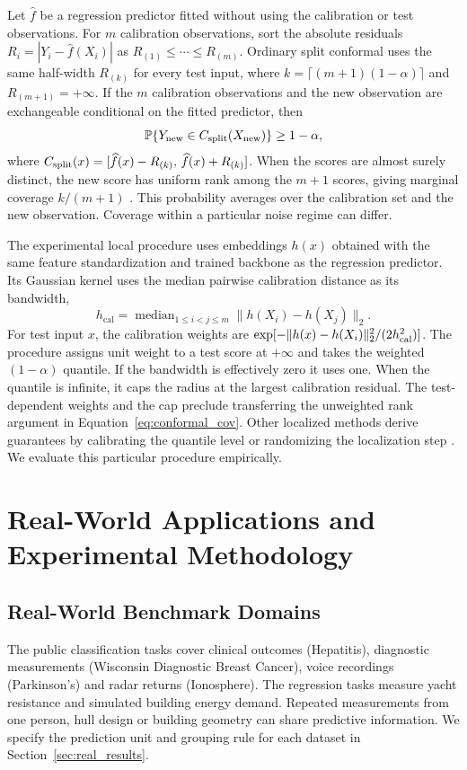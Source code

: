 \documentclass[journal]{IEEEtran}
\begin{document}
Let $\widehat f$ be a regression predictor fitted without using the calibration or test observations. For $m$ calibration observations, sort the absolute residuals $R_i=|Y_i-\widehat f(X_i)|$ as $R_{(1)}\le\cdots\le R_{(m)}$. Ordinary split conformal uses the same half-width $R_{(k)}$ for every test input, where $k=\lceil(m+1)(1-\alpha)\rceil$ and $R_{(m+1)}=+\infty$. If the $m$ calibration observations and the new observation are exchangeable conditional on the fitted predictor, then
\begin{equation}
\label{eq:conformal_cov}
\mathbb P\!\left\{Y_{\rm new}\in C_{\rm split}(X_{\rm new})\right\}\geq 1-\alpha,
\end{equation}
where $C_{\rm split}(x)=[\widehat f(x)-R_{(k)},\,\widehat f(x)+R_{(k)}]$. When the scores are almost surely distinct, the new score has uniform rank among the $m+1$ scores, giving marginal coverage $k/(m+1)$ \cite{vovk2005algorithmic, angelopoulos2023gentle}. This probability averages over the calibration set and the new observation. Coverage within a particular noise regime can differ.

The experimental local procedure uses embeddings $h(x)$ obtained with the same feature standardization and trained backbone as the regression predictor. Its Gaussian kernel uses the median pairwise calibration distance as its bandwidth,
\begin{equation}
\label{eq:h_cal}
h_{\text{cal}}=\operatorname{median}_{1\leq i<j\leq m}\|h(X_i)-h(X_j)\|_2 .
\end{equation}
For test input $x$, the calibration weights are $\exp[-\|h(x)-h(X_i)\|_2^2/(2h_{\rm cal}^2)]$. The procedure assigns unit weight to a test score at $+\infty$ and takes the weighted $(1-\alpha)$ quantile. If the bandwidth is effectively zero it uses one. When the quantile is infinite, it caps the radius at the largest calibration residual. The test-dependent weights and the cap preclude transferring the unweighted rank argument in Equation~\eqref{eq:conformal_cov}. Other localized methods derive guarantees by calibrating the quantile level \cite{guan2023lcp} or randomizing the localization step \cite{hore2025rlcp}. We evaluate this particular procedure empirically.

\section{Real-World Applications and Experimental Methodology}

\subsection{Real-World Benchmark Domains}
The public classification tasks cover clinical outcomes (Hepatitis), diagnostic measurements (Wisconsin Diagnostic Breast Cancer), voice recordings (Parkinson's) and radar returns (Ionosphere). The regression tasks measure yacht resistance and simulated building energy demand. Repeated measurements from one person, hull design or building geometry can share predictive information. We specify the prediction unit and grouping rule for each dataset in Section~\ref{sec:real_results}.
\end{document}
